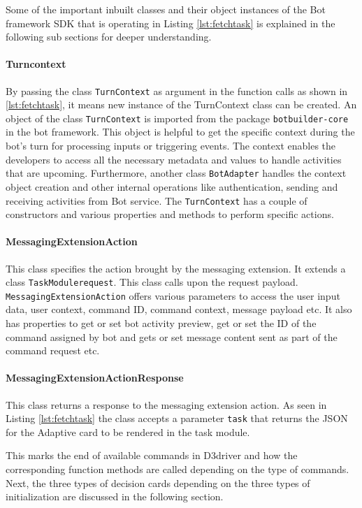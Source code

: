 Some of the important inbuilt classes and their object instances of the Bot framework SDK that is operating in Listing \ref{lst:fetchtask} is explained in the following sub sections for deeper understanding.
\raggedbottom
\paragraph{Turncontext}
By passing the class \texttt{TurnContext} as argument in the function calls as shown in \ref{lst:fetchtask}, it means new instance of the TurnContext class can be created. An object of the class \texttt{TurnContext} is imported from the package \texttt{botbuilder-core} in the bot framework. This object is helpful to get the specific context during the bot's turn for processing inputs or triggering events. The context enables the developers to access all the necessary metadata and values to handle activities that are upcoming. Furthermore, another class \texttt{BotAdapter} handles the context object creation and other internal operations like authentication, sending and receiving activities from Bot service. The \texttt{TurnContext} has a couple of constructors and various properties and methods to perform specific actions.

\paragraph{MessagingExtensionAction}
This class specifies the action brought by the messaging extension. It extends a class \texttt{TaskModulerequest}. This class calls upon the request payload. \newline \texttt{MessagingExtensionAction} offers various parameters to access the user input data, user context, command ID, command context, message payload etc. It also has properties to get or set bot activity preview, get or set the ID of the command assigned by bot and gets or set message content sent as part of the command request etc. 
			
\paragraph{MessagingExtensionActionResponse}
This class returns a response to the messaging extension action. As seen in Listing \ref{lst:fetchtask} the class accepts a parameter \texttt{task} that returns the JSON for the Adaptive card to be rendered in the task module.

This marks the end of available commands in D3driver and how the corresponding function methods are called depending on the type of commands. Next, the three types of decision cards depending on the three types of initialization are discussed in the following section.

